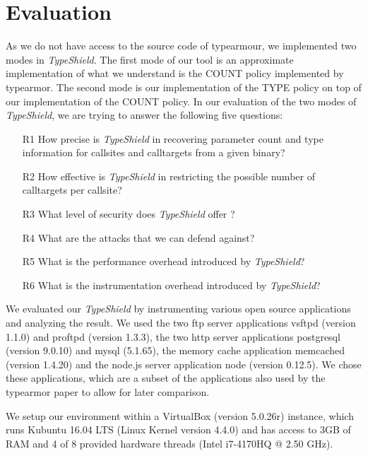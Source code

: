 \chapter{Evaluation}
\label{chapter:Evaluation}
As we do not have access to the source code of typearmour, we implemented two modes in \textit{TypeShield}. The first mode of our tool is an approximate implementation of what we understand is the COUNT policy implemented by typearmor. The second mode is our implementation of the TYPE policy on top of our implementation of the COUNT policy. In our evaluation of the two modes of \textit{TypeShield}, we are trying to answer the following five questions:
\begin{enumerate}

 \item[R1] How precise is \textit{TypeShield} in recovering parameter count and type information for callsites and calltargets from a given binary?

 \item[R2] How effective is \textit{TypeShield} in restricting the possible number of calltargets per callsite?

 \item[R3]  What level of security does \textit{TypeShield} offer ?
 
 \item[R4]  What are the attacks that we can defend against?

 \item[R5] What is the performance overhead introduced by \textit{TypeShield}?

 \item[R6] What is the instrumentation overhead introduced by \textit{TypeShield}?

\end{enumerate}
We evaluated our \textit{TypeShield} by instrumenting various open source applications and analyzing the result. We used the two ftp server applications vsftpd (version 1.1.0) and proftpd (version 1.3.3), the two http server applications postgresql (version 9.0.10) and  mysql (5.1.65), the memory cache application memcached (version 1.4.20) and the node.js server application node (version 0.12.5). We chose these applications, which are a subset of the applications also used by the typearmor paper\cite{typearmor} to allow for later comparison.

We setup our environment within a VirtualBox (version 5.0.26r) instance, which runs Kubuntu 16.04 LTS (Linux Kernel version 4.4.0) and has access to 3GB of RAM and 4 of 8 provided hardware threads (Intel i7-4170HQ @ 2.50 GHz).

